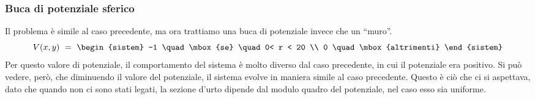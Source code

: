 \subsubsection{Buca di potenziale sferico}
Il problema è simile al caso precedente, ma ora trattiamo una buca di potenziale invece che un ``muro''.
$$
V(x,y) \ = \ \begin{sistem}
             -1 \quad \mbox{se} \quad  0< r < 20 \\
              0 \quad \mbox{altrimenti}
             \end{sistem}
$$
Per questo valore di potenziale, il comportamento del sistema è molto diverso dal caso precedente, in cui il potenziale era positivo. Si
può vedere, però, che diminuendo il valore del potenziale, il sistema evolve in maniera simile al caso precedente. Questo è ciò che ci si aspettava,
dato che quando non ci sono stati legati, la sezione d'urto dipende dal modulo quadro del potenziale, nel caso esso sia uniforme. 

